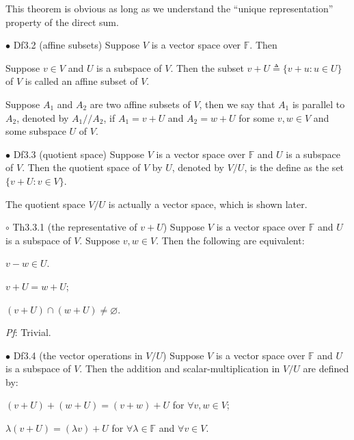 \documentclass{article}
\begin{document}
\begin{Rmk}{}
    This theorem is obvious as long as we understand the ``unique representation'' property of the direct sum.
\end{Rmk}

\begin{Df}{$\bullet$ Df3.2 (affine subsets)}
    Suppose $V$ is a vector space over $\mathbb{F}$. Then
    \begin{compactenum}
        \item Suppose $v\in V$ and $U$ is a subspace of $V$. Then the subset $v+U \triangleq \{v+u: u\in U\}$ of $V$ is called an affine subset of $V$.
        \item Suppose $A_1$ and $A_2$ are two affine subsets of $V$, then we say that $A_1$ is parallel to $A_2$, denoted by $A_1// A_2$, if $A_1 = v + U$ and $A_2 = w + U$ for some $v, w\in V$ and some subspace $U$ of $V$.
    \end{compactenum} 
\end{Df}

\begin{Df}{$\bullet$ Df3.3 (quotient space)}
    Suppose $V$ is a vector space over $\mathbb{F}$ and $U$ is a subspace of $V$. Then the quotient space of $V$ by $U$, denoted by $V/U$, is the define as the set $\{v+U: v\in V\}$.
\end{Df}

\begin{Rmk}{}
    The quotient space $V/U$ is actually a vector space, which is shown later.
\end{Rmk}

\begin{Th}{$\circ$ Th3.3.1 (the representative of $v+U$)}
    Suppose $V$ is a vector space over $\mathbb{F}$ and $U$ is a subspace of $V$. Suppose $v,w\in V$. Then the following are equivalent:
    \begin{compactenum}
        \item $v-w \in U$.
        \item $v + U = w + U$;
        \item $(v+U)\cap (w+U)\neq \varnothing$.
    \end{compactenum}
    \tcblower
    \textit{Pf}: Trivial.
\end{Th}

\begin{Df}{$\bullet$ Df3.4 (the vector operations in $V/U$)}
    Suppose $V$ is a vector space over $\mathbb{F}$ and $U$ is a subspace of $V$. Then the addition and scalar-multiplication in $V/U$ are defined by:
    \begin{compactenum}
        \item $(v+U) + (w+U) = (v+w) + U$ for $\forall v, w\in V$;
        \item $\lambda(v+U) = (\lambda v) + U$ for $\forall \lambda\in \mathbb{F}$ and $\forall v\in V$.
    \end{compactenum}
\end{Df}
\end{document}

